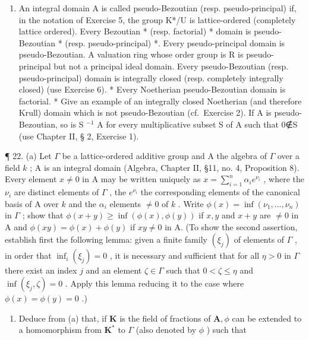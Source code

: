 \begin{enumerate}
\def\labelenumi{\arabic{enumi}.}
\setcounter{enumi}{20}
\tightlist
\item
  An integral domain A is called pseudo-Bezoutian (resp. pseudo-principal) if, in the notation of Exercise 5, the group K*/U is lattice-ordered (completely lattice ordered). Every Bezoutian * (resp. factorial) * domain is pseudo-Bezoutian * (resp. pseudo-principal) *. Every pseudo-principal domain is pseudo-Bezoutian. A valuation ring whose order group is R is pseudo-principal but not a principal ideal domain. Every pseudo-Bezoutian (resp. pseudo-principal) domain is integrally closed (resp. completely integrally closed) (use Exercise 6). * Every Noetherian pseudo-Bezoutian domain is factorial. * Give an example of an integrally closed Noetherian (and therefore Krull) domain which is not pseudo-Bezoutian (cf.~Exercise 2). If A is pseudo-Bezoutian, so is S \(^{-1}\) A for every multiplicative subset S of A such that 0∉S (use Chapter II, § 2, Exercise 1).
\end{enumerate}

¶ 22. (a) Let \(\Gamma\) be a lattice-ordered additive group and A the algebra of \(\Gamma\) over a field \(k\) ; A is an integral domain (Algebra, Chapter II, §11, no. 4, Proposition 8). Every element \(x \neq 0\) in A may be written uniquely as \(x = \sum_{i=1}^{n} \alpha_i e^{\nu_i}\) , where the \(\nu_i\) are distinct elements of \(\Gamma\) , the \(e^{\nu_i}\) the corresponding elements of the canonical basis of A over \(k\) and the \(\alpha_i\) elements \(\neq 0\) of \(k\) . Write \(\phi(x) = \inf(\nu_1, \ldots, \nu_n)\) in \(\Gamma\) ; show that \(\phi(x + y) \geqslant \inf(\phi(x), \phi(y))\) if \(x, y\) and \(x + y\) are \(\neq 0\) in A and \(\phi(xy) = \phi(x) + \phi(y)\) if \(xy \neq 0\) in A. (To show the second assertion, establish first the following lemma: given a finite family \((\xi_j)\) of elements of \(\Gamma\) , in order that \(\inf_{i} (\xi_j) = 0\) , it is necessary and sufficient that for all \(\eta > 0\) in \(\Gamma\) there exist an index \(j\) and an element \(\zeta \in \Gamma\) such that \(0 < \zeta \leqslant \eta\) and \(\inf(\xi_j, \zeta) = 0\) . Apply this lemma reducing it to the case where \(\phi(x) = \phi(y) = 0\) .)

\begin{enumerate}
\def\labelenumi{(\alph{enumi})}
\setcounter{enumi}{1}
\tightlist
\item
  Deduce from (a) that, if \(\mathbf{K}\) is the field of fractions of \(\mathbf{A},\phi\) can be extended to a homomorphism from \(\mathbf{K}^*\) to \(\Gamma\) (also denoted by \(\phi\) ) such that
\end{enumerate}

